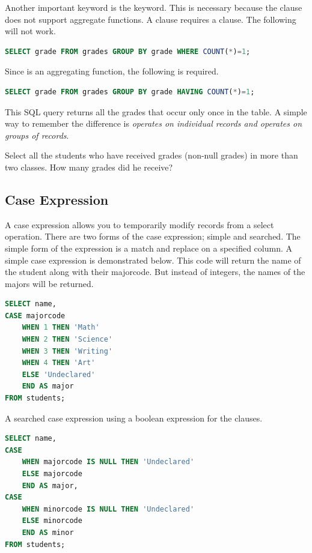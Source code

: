 Another important keyword is the  keyword.
This is necessary because the  clause does not support aggregate functions.
A  clause requires a  clause.
The following will not work.
\begin{lstlisting}[language=SQL]
SELECT grade FROM grades GROUP BY grade WHERE COUNT(*)=1;
\end{lstlisting}
Since  is an aggregating function, the following is required.
\begin{lstlisting}[language=SQL]
SELECT grade FROM grades GROUP BY grade HAVING COUNT(*)=1;
\end{lstlisting}
This SQL query returns all the grades that occur only once in the table.
A simple way to remember the difference is \emph{ operates on individual records and  operates on groups of records}.

\begin{problem}
Select all the students who have received grades (non-null grades) in more than two classes.  How many grades did he receive?
\label{prob:manygrades}
\end{problem}

\subsection*{Case Expression}
A case expression allows you to temporarily modify records from a select operation.
There are two forms of the case expression; simple and searched.
The simple form of the expression is a match and replace on a specified column.
A simple case expression is demonstrated below.
This code will return the name of the student along with their majorcode.
But instead of integers, the names of the majors will be returned.
\begin{lstlisting}[language=SQL]
SELECT name, 
CASE majorcode 
    WHEN 1 THEN 'Math' 
    WHEN 2 THEN 'Science' 
    WHEN 3 THEN 'Writing' 
    WHEN 4 THEN 'Art' 
    ELSE 'Undeclared' 
    END AS major
FROM students;
\end{lstlisting}

A searched case expression using a boolean expression for the  clauses.
\begin{lstlisting}[language=SQL]
SELECT name, 
CASE 
    WHEN majorcode IS NULL THEN 'Undeclared' 
    ELSE majorcode 
    END AS major, 
CASE 
    WHEN minorcode IS NULL THEN 'Undeclared' 
    ELSE minorcode 
    END AS minor 
FROM students;
\end{lstlisting}

